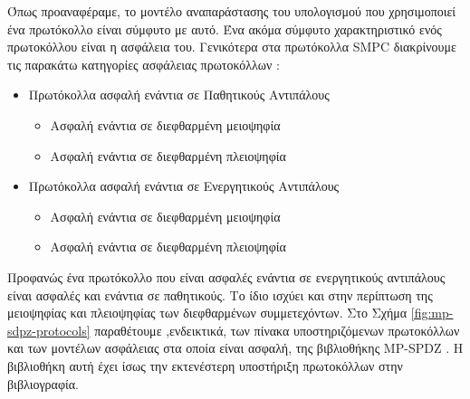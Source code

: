 Όπως προαναφέραμε, το μοντέλο αναπαράστασης του υπολογισμού που χρησιμοποιεί ένα πρωτόκολλο είναι σύμφυτο με αυτό. Ένα ακόμα σύμφυτο χαρακτηριστικό ενός πρωτοκόλλου είναι η ασφάλεια του. Γενικότερα στα πρωτόκολλα SMPC διακρίνουμε τις παρακάτω κατηγορίες ασφάλειας πρωτοκόλλων :

\begin{itemize}
    \item Πρωτόκολλα ασφαλή ενάντια σε Παθητικούς Αντιπάλους
        \begin{itemize}
            \item Ασφαλή ενάντια σε διεφθαρμένη μειοψηφία
            \item Ασφαλή ενάντια σε διεφθαρμένη πλειοψηφία
        \end{itemize}
    \item Πρωτόκολλα ασφαλή ενάντια σε Ενεργητικούς Αντιπάλους
        \begin{itemize}
            \item Ασφαλή ενάντια σε διεφθαρμένη μειοψηφία
            \item Ασφαλή ενάντια σε διεφθαρμένη πλειοψηφία
        \end{itemize}
\end{itemize}

Προφανώς ένα πρωτόκολλο που είναι ασφαλές ενάντια σε ενεργητικούς αντιπάλους είναι ασφαλές και ενάντια σε παθητικούς. Το ίδιο ισχύει και στην περίπτωση της μειοψηφίας και πλειοψηφίας των διεφθαρμένων συμμετεχόντων. Στο Σχήμα \ref{fig:mp-sdpz-protocols} παραθέτουμε ,ενδεικτικά, των πίνακα υποστηριζόμενων πρωτοκόλλων και των μοντέλων ασφάλειας στα οποία είναι ασφαλή, της βιβλιοθήκης MP-SPDZ \cite{mp-spdz}. Η βιβλιοθήκη αυτή έχει ίσως την εκτενέστερη υποστήριξη πρωτοκόλλων στην βιβλιογραφία.

